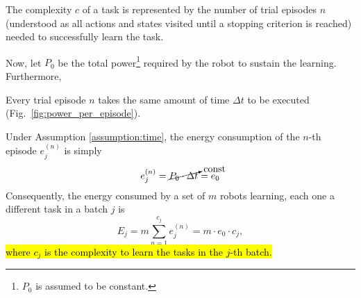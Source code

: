 \begin{tcolorbox}
\begin{definition}\label{definition:complexity} The complexity $c$ of a task is represented by the number of trial episodes $n$ (understood as all actions and states visited until a stopping criterion is reached) needed to successfully learn the task. 
\end{definition}
\end{tcolorbox}
Now, let $P_0$ be the total power\footnote{$P_0$ is assumed to be constant.} required by the robot to sustain the learning. Furthermore,
\begin{tcolorbox}
\begin{assumption}\label{assumption:time} Every trial episode $n$ takes the same amount of time $\Delta t$ to be executed (Fig.~\ref{fig:power_per_episode}).
\end{assumption}
\end{tcolorbox}
Under Assumption \ref{assumption:time}, the energy consumption of the $n$-th episode $e^{(n)}_j$ is simply
\begin{equation}\label{eq:energy_per_episode}
    e^{(n)}_j = \cancelto{\text{const}}{P_0\cdot \Delta t} = e_0
\end{equation}
Consequently, the energy consumed by a set of $m$ robots learning, each one a different task in a batch $j$ is
\begin{equation}\label{eq:energy_per_task}
    E_j =m \sum_{n=1}^{c_j} e^{(n)}_j = m \cdot e_0 \cdot c_j,
\end{equation}
\hl{where $c_j$ is the complexity to learn the tasks in the $j$-th batch.}

